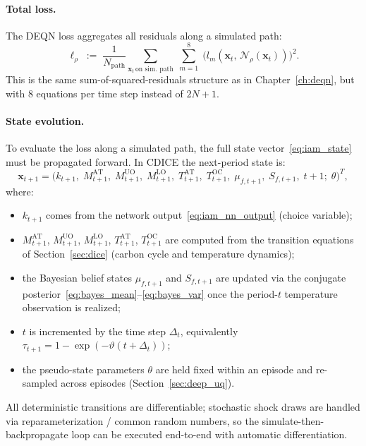 \documentclass[11pt,a4paper]{report}
\begin{document}
\paragraph{Total loss.}
The DEQN loss aggregates all residuals along a simulated path:
\begin{equation}
\ell_\rho \;:=\; \frac{1}{N_{\text{path}}} \sum_{\bm{x}_t\,\text{on sim.\ path}} \;\sum_{m=1}^{8}\; \bigl(l_m(\bm{x}_t,\, \mathcal{N}_\rho(\bm{x}_t))\bigr)^2.
\label{eq:iam_loss}
\end{equation}
This is the same sum-of-squared-residuals structure as in Chapter~\ref{ch:deqn}, but with 8 equations per time step instead of $2N+1$.

\paragraph{State evolution.}
To evaluate the loss along a simulated path, the full state vector~\eqref{eq:iam_state} must be propagated forward.  In CDICE the next-period state is:
\begin{equation}
\bm{x}_{t+1} = \bigl(k_{t+1},\; M^{\mathrm{AT}}_{t+1},\; M^{\mathrm{UO}}_{t+1},\; M^{\mathrm{LO}}_{t+1},\; T^{\mathrm{AT}}_{t+1},\; T^{\mathrm{OC}}_{t+1},\; \mu_{f,t+1},\; S_{f,t+1},\; t+1;\; \theta\bigr)^T,
\label{eq:iam_state_evol}
\end{equation}
where:
\begin{itemize}[itemsep=2pt]
\item $k_{t+1}$ comes from the network output~\eqref{eq:iam_nn_output} (choice variable);
\item $M^{\mathrm{AT}}_{t+1}$, $M^{\mathrm{UO}}_{t+1}$, $M^{\mathrm{LO}}_{t+1}$, $T^{\mathrm{AT}}_{t+1}$, $T^{\mathrm{OC}}_{t+1}$ are computed from the transition equations of Section~\ref{sec:dice} (carbon cycle and temperature dynamics);
\item the Bayesian belief states $\mu_{f,t+1}$ and $S_{f,t+1}$ are updated via the conjugate posterior~\eqref{eq:bayes_mean}--\eqref{eq:bayes_var} once the period-$t$ temperature observation is realized;
\item $t$ is incremented by the time step $\Delta_t$, equivalently $\tau_{t+1} = 1 - \exp(-\vartheta(t+\Delta_t))$;
\item the pseudo-state parameters $\theta$ are held fixed within an episode and re-sampled across episodes (Section~\ref{sec:deep_uq}).
\end{itemize}
All deterministic transitions are differentiable; stochastic shock draws are handled via reparameterization / common random numbers, so the simulate-then-backpropagate loop can be executed end-to-end with automatic differentiation.
\end{document}
